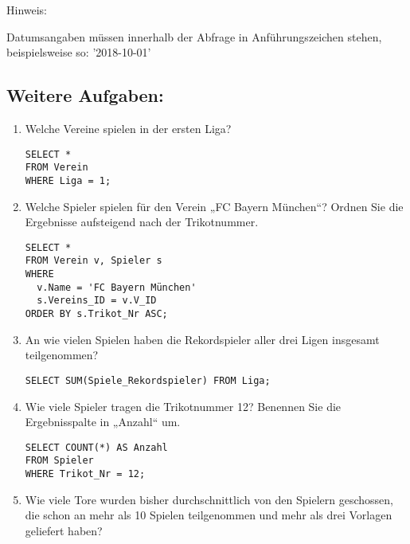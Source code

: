\documentclass{lehramt-informatik-aufgabe}
\begin{document}
Hinweis:

Datumsangaben müssen innerhalb der Abfrage in Anführungszeichen stehen,
beispielsweise so: '2018-10-01'

%

\subsection{Weitere Aufgaben:}

\begin{enumerate}

%

\item Welche Vereine spielen in der ersten Liga?

\begin{verbatim}
SELECT *
FROM Verein
WHERE Liga = 1;
\end{verbatim}

%

\item Welche Spieler spielen für den Verein „FC Bayern München“? Ordnen
Sie die Ergebnisse aufsteigend nach der Trikotnummer.

\begin{verbatim}
SELECT *
FROM Verein v, Spieler s
WHERE
  v.Name = 'FC Bayern München'
  s.Vereins_ID = v.V_ID
ORDER BY s.Trikot_Nr ASC;
\end{verbatim}

%

\item An wie vielen Spielen haben die Rekordspieler aller drei Ligen
insgesamt teilgenommen?

\begin{verbatim}
SELECT SUM(Spiele_Rekordspieler) FROM Liga;
\end{verbatim}

%

\item Wie viele Spieler tragen die Trikotnummer 12? Benennen Sie die
Ergebnisspalte in „Anzahl“ um.

\begin{verbatim}
SELECT COUNT(*) AS Anzahl
FROM Spieler
WHERE Trikot_Nr = 12;
\end{verbatim}

%

\item Wie viele Tore wurden bisher durchschnittlich von den Spielern
geschossen, die schon an mehr als 10 Spielen teilgenommen und mehr als
drei Vorlagen geliefert haben?


\end{enumerate}
\end{document}
